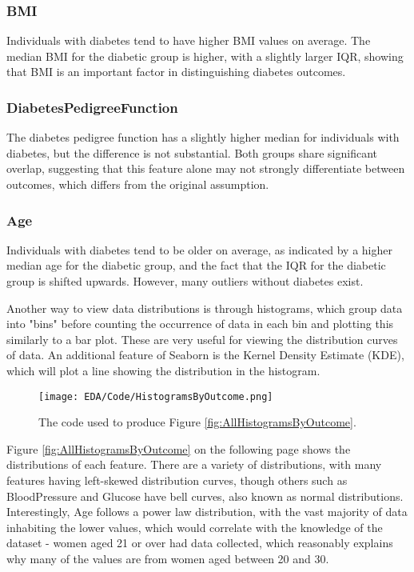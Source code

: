 \subsubsection{BMI}
Individuals with diabetes tend to have higher BMI values on average.
The median BMI for the diabetic group is higher, with a slightly larger IQR, showing that BMI is an important factor in distinguishing diabetes outcomes.

\subsubsection{DiabetesPedigreeFunction}
The diabetes pedigree function has a slightly higher median for individuals with diabetes, but the difference is not substantial.
Both groups share significant overlap, suggesting that this feature alone may not strongly differentiate between outcomes, which 
differs from the original assumption.

\subsubsection{Age}
Individuals with diabetes tend to be older on average, as indicated by a higher median age for the diabetic group, and the fact that 
the IQR for the diabetic group is shifted upwards. However, many outliers without diabetes exist.


\para Another way to view data distributions is through histograms, which group data into "bins" before counting the occurrence of 
data in each bin and plotting this similarly to a bar plot. These are very useful for viewing the distribution curves of data. 
An additional feature of Seaborn is the Kernel Density Estimate (KDE), which will plot a line showing the distribution in the histogram.


\begin{figure}[H]
    \centering
    \texttt{[image: EDA/Code/HistogramsByOutcome.png]}
    \caption{The code used to produce Figure \ref{fig:AllHistogramsByOutcome}.}
    \label{fig:HistogramsByOutcomeCode}
\end{figure}

\para Figure \ref{fig:AllHistogramsByOutcome} on the following page shows the distributions of each 
feature. There are a variety of distributions, with many features having left-skewed distribution curves,
though others such as BloodPressure and Glucose have bell curves, also known as normal distributions.
Interestingly, Age follows a power law distribution, with the vast majority of data inhabiting the lower 
values, which would correlate with the knowledge of the dataset - women aged 21 or over had data collected,
which reasonably explains why many of the values are from women aged between 20 and 30.

